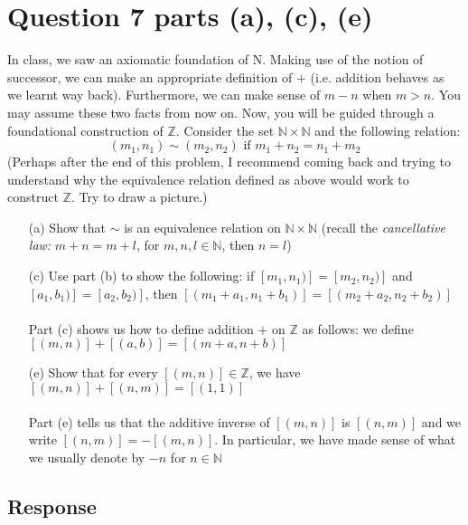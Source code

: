 \documentclass[13pt]{article}
\begin{document}
\section{Question 7 parts (a), (c), (e)}
In class, we saw an axiomatic foundation of N. Making use of the notion of successor, we can make an appropriate
definition of + (i.e. addition behaves as we learnt way back). Furthermore, we can make sense of $m - n$ when
$m > n$. You may assume these two facts from now on. Now, you will be guided through a foundational construction
of $\mathbb{Z}$. Consider the set $\mathbb{N} \times \mathbb{N}$ and the following relation:
\[(m_1, n_1) \sim (m_2, n_2) \text{ if } m_1 + n_2 = n_1 + m_2\]
(Perhaps after the end of this problem, I recommend coming back and trying to understand why the equivalence
relation defined as above would work to construct $\mathbb{Z}$. Try to draw a picture.)
\begin{enumerate}
\item [(a)] Show that $\sim$ is an equivalence relation on $\mathbb{N} \times \mathbb{N}$ (recall the
  \textit{cancellative law:} $m + n = m + l$, for $m, n, l \in \mathbb{N}$, then $n = l$)
\item [(c)] Use part (b) to show the following: if $[m_1, n_1)] = [m_2, n_2)]$ and $[a_1, b_1)] = [a_2, b_2)]$,
  then $[(m_1 + a_1, n_1 + b_1)] = [(m_2 + a_2, n_2 + b_2)]$ \\ \\
  Part (c) shows us how to define addition $+$ on $\mathbb{Z}$ as follows: we define $[(m, n)] + [(a, b)] =
  [(m + a, n + b)]$
\item [(e)] Show that for every $[(m, n)] \in \mathbb{Z}$, we have $[(m, n)] + [(n, m)] = [(1, 1)]$ \\ \\
  Part (e) tells us that the additive inverse of $[(m, n)]$ is $[(n, m)]$ and we write $[(n, m)] = -[(m, n)]$.
  In particular, we have made sense of what we usually denote by $-n$ for $n \in \mathbb{N}$
\end{enumerate}
\subsection*{Response}
\end{document}
